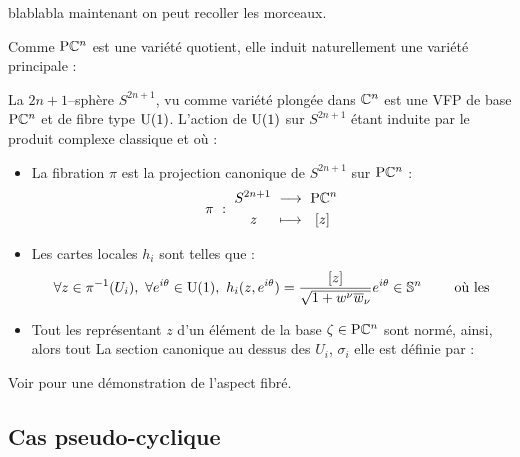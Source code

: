 blablabla maintenant on peut recoller les morceaux.
 



Comme $\text{\normalfont P}\mathbb{C}^{n}$ est une variété quotient, elle induit naturellement une variété principale :
\begin{proposition}
	La $2n+1$--sphère $S^{2n+1}$, vu comme variété plongée dans $\mathbb{C}^n$ est une VFP de base $\text{\normalfont P}\mathbb{C}^{n}$ et de fibre type $\text{\normalfont U}(1)$. L'action de $\text{\normalfont U}(1)$ sur $S^{2n+1}$ étant induite par le produit complexe classique et où :
	\begin{itemize}
		\item La fibration $\pi$ est la projection canonique de $S^{2n+1}$ sur $\text{\normalfont P}\mathbb{C}^{n}$ :
		\[\pi\ :\ \begin{aligned}S^{2n+1}\ &\longrightarrow\ \text{\normalfont P}\mathbb{C}^{n} \\ z\quad\ &\longmapsto\ \ [z]\end{aligned}\]
		
		\item Les cartes locales $h_i$ sont telles que :
		\[\forall z \in \pi^{-1}(U_i),\ \forall e^{i\theta}\in\text{\normalfont U}(1),\  h_i(z,e^{i\theta}) = \frac{[z]}{\sqrt{1 + w^\nu \overline{w}_\nu}}e^{i\theta} \in \mathbb{ S}^{n}\qquad \text{ où les}\]
		
		\item Tout les représentant $z$ d'un élément de la base $\zeta\in\text{\normalfont P}\mathbb{C}^{n}$ sont normé, ainsi, alors tout La section canonique au dessus des $U_i$, $\sigma_i$ elle est définie par :
		\[\]
		
	\end{itemize}
	
	Voir \cite[lemme 2.17]{lafontaine_introduction_2015} pour une démonstration de l'aspect fibré.
\end{proposition}




\subsection{Cas pseudo-cyclique}








